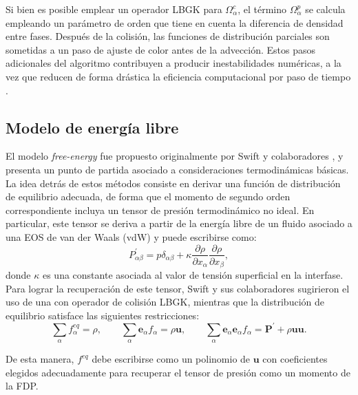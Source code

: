 Si bien es posible emplear un operador LBGK para $\Omega_{\alpha}^c$, el t\'ermino $\Omega_{\alpha}^p$ se calcula empleando un par\'ametro de orden que tiene en cuenta la diferencia de densidad entre fases. Despu\'es de la colisi\'on, las funciones de distribuci\'on parciales son sometidas a un paso de ajuste de color antes de la advecci\'on. Estos pasos adicionales del algoritmo contribuyen a producir inestabilidades num\'ericas, a la vez que reducen de forma dr\'astica la eficiencia computacional por paso de tiempo \cite{guo_lattice_2013}.

\subsection{Modelo de energ\'ia libre}
El modelo \emph{free-energy} fue propuesto originalmente por Swift y colaboradores \cite{swift_lattice_1996}, y presenta un punto de partida asociado a consideraciones termodin\'amicas b\'asicas. La idea detr\'as de estos m\'etodos consiste en derivar una funci\'on de distribuci\'on de equilibrio adecuada, de forma que el momento de segundo orden correspondiente incluya un tensor de presi\'on termodin\'amico no ideal. En particular, este tensor se deriva a partir de la energ\'ia libre de un fluido asociado a una EOS de van der Waals (vdW) y puede escribirse como:
\begin{equation}
	P^{'}_{\alpha\beta}=p\delta_{\alpha\beta}+\kappa\dfrac{\partial \rho}{\partial x_{\alpha}}\dfrac{\partial \rho}{\partial x_{\beta}},
\end{equation}
donde $\kappa$ es una constante asociada al valor de tensi\'on superficial en la interfase. Para lograr la recuperaci\'on de este tensor, Swift y sus colaboradores sugirieron el uso de una \lbe{} con operador de colisi\'on LBGK, mientras que la distribuci\'on de equilibrio satisface las siguientes restricciones:
\begin{equation}
	\sum_{\alpha} f_{\alpha}^{eq} = \rho, \qquad \sum_{\alpha} \bm{e}_{\alpha} f_{\alpha}=\rho\bm{u}, \qquad
	\sum_{\alpha} \bm{e}_{\alpha} \bm{e}_{\alpha} f_{\alpha}= \bm{P}^{'}+\rho\bm{u}\bm{u}.
	\label{eq:free_energy+rest}
\end{equation}

De esta manera, $f^{eq}$ debe escribirse como un polinomio de $\bm{u}$ con coeficientes elegidos adecuadamente para recuperar el tensor de presi\'on como un momento de la FDP.


